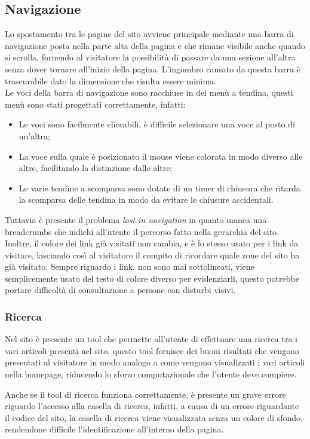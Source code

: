\subsection{Navigazione}%
Lo spostamento tra le pagine del sito avviene principale mediante una barra di navigazione posta nella parte alta della pagina e che rimane visibile anche quando si scrolla, fornendo al visitatore la possibilità di passare da una sezione all'altra senza dover tornare all'inizio della pagina.
L'ingombro causato da questa barra è trascurabile dato la dimensione che risulta essere minima.\\
Le voci della barra di navigazione sono racchiuse in dei menù a tendina, questi menù sono stati progettati correttamente, infatti:
\begin{itemize}
\item Le voci sono facilmente cliccabili, è difficile selezionare una voce al posto di un'altra;
\item La voce sulla quale è posizionato il mouse viene colorata in modo diverso alle altre, facilitando la distinzione dalle altre;
\item Le varie tendine a scomparsa sono dotate di un timer di chiusura che ritarda la scomparsa delle tendina in modo da evitare le chiusure accidentali.
\end{itemize}
Tuttavia è presente il problema \textit{lost in navigation} in quanto manca una breadcrumbs che indichi all'utente il percorso fatto nella gerarchia del sito. Inoltre, il colore dei link già visitati non cambia, e è lo stesso usato per i link da visitare, lasciando così al visitatore il compito di ricordare quale zone del sito ha già visitato.
Sempre riguardo i link, non sono mai sottolineati, viene semplicemente usato del testo di colore diverso per evidenziarli, questo potrebbe portare difficoltà di consultazione a persone con disturbi visivi.

\subsubsection{Ricerca}%
Nel sito è presente un tool che permette all'utente di effettuare una ricerca tra i vari articoli presenti nel sito, questo tool fornisce dei buoni risultati che vengono presentati al visitatore in modo analogo a come vengono visualizzati i vari articoli nella homepage, riducendo lo sforzo computazionale che l'utente deve compiere.

Anche se il tool di ricerca funziona correttamente, è presente un grave errore riguardo l'accesso alla casella di ricerca, infatti, a causa di un errore riguardante il codice del sito, la casella di ricerca viene visualizzata senza un colore di sfondo, rendendone difficile l'identificazione all'interno della pagina.

